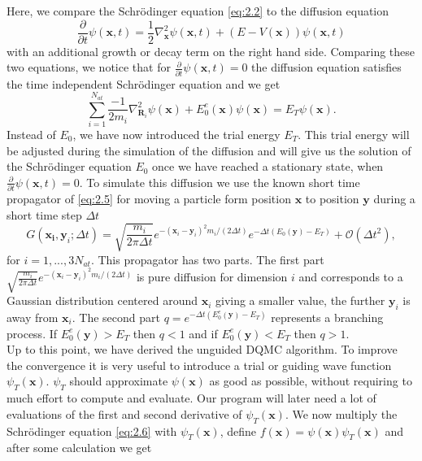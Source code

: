 \documentclass [12pt]{report}
\begin{document}
Here, we compare the Schrödinger equation \eqref{eq:2.2} to the diffusion equation 
\begin{equation} \label{eq:2.5}
\frac{\partial}{\partial t} \psi(\bm{x},t) = \frac{1}{2} \nabla^2_{\bm{x}} \psi(\bm{x},t) + (E - V(\bm{x}))\psi(\bm{x},t)
\end{equation}
with an additional growth or decay term on the right hand side.
Comparing these two equations, we notice that for $\frac{\partial}{\partial t} \psi(\bm{x},t) = 0$ the diffusion equation satisfies the time independent Schrödinger equation and we get
\begin{equation} \label{eq:2.6}
\sum_{i=1}^{N_{at}} \frac{-1}{2m_i} \nabla^2_{\bm{R}_i} \psi(\bm{x}) + E_0^e(\bm{x})\psi(\bm{x}) = E_T \psi(\bm{x}).
\end{equation}
Instead of $E_0$, we have now introduced the trial energy $E_T$. This trial energy will be adjusted during the simulation of the diffusion and will give us the solution of the Schrödinger equation $E_0$ once we have reached a stationary state, when $\frac{\partial}{\partial t} \psi(\bm{x},t) = 0$. To simulate this diffusion we use the known short time propagator of \eqref{eq:2.5} for moving a particle form position $\bm{x}$ to position $\bm{y}$ during a short time step $\Delta t$
\begin{equation} \label{eq:2.7}
G(\bm{x_i},\bm{y}_i;\Delta t) = \sqrt{\frac{m_i}{2 \pi \Delta t}} e^{-(\bm{x}_i-\bm{y}_i)^2 m_i/(2 \Delta t)} e^{-\Delta t (E_0(\bm{y}) - E_T)} + \mathcal{O}(\Delta t^2),
\end{equation}
for $i=1,...,3N_{at}$. This propagator has two parts. The first part $\sqrt{\frac{m_i}{2 \pi \Delta t}} e^{-(\bm{x}_i-\bm{y}_i)^2 m_i/(2\Delta t)}$ is pure diffusion for dimension $i$ and corresponds to a Gaussian distribution centered around $\bm{x}_i$ giving a smaller value, the further $\bm{y}_i$ is away from $\bm{x}_i$. The second part $q = e^{-\Delta t (E_0^e(\bm{y}) - E_T)}$ represents a branching process. If $E_0^e(\bm{y}) > E_T$ then $q < 1$ and if $E_0^e(\bm{y}) < E_T$ then $q > 1$.\\
Up to this point, we have derived the unguided DQMC algorithm. To improve the convergence it is very useful to introduce a trial or guiding wave function $\psi_T(\bm{x})$. $\psi_T$ should approximate $\psi(\bm{x})$ as good as possible, without requiring to much effort to compute and evaluate. Our program will later need a lot of evaluations of the first and second derivative of $\psi_T(\bm{x})$. We now multiply the Schrödinger equation \eqref{eq:2.6} with $\psi_T(\bm{x})$, define $f(\bm{x}) = \psi(\bm{x}) \psi_T(\bm{x})$ and after some calculation \cite{cyrus2} we get
\end{document}

